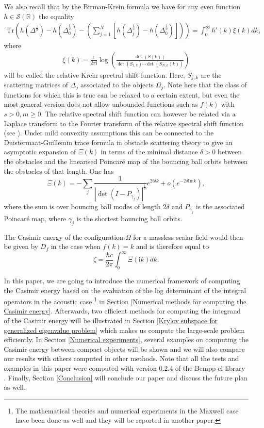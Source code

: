 We also recall that by the Birman-Krein formula we have for any even function $h \in \mathcal{S}(\mathbb{R})$ the equality
\begin{align}\label{B-K formula}
    \text{Tr}\left(h(\Delta^{\frac{1}{2}}) - h(\Delta_{0}^{\frac{1}{2}}) - \left(\sum_{j = 1}^{N}[h(\Delta_{j}^{\frac{1}{2}}) - h(\Delta_{0}^{\frac{1}{2}})]\right)\right)  = \int_{0}^{\infty}h'(k)\xi(k)dk,
\end{align}
where 
\begin{align*}
    \xi(k) = \frac{1}{2\pi \mathrm{i}}\log\left(\frac{\det(S(k))}{\det(S_{1,k})\cdots\det(S_{N,k}(k))}\right)
\end{align*}
will be called the relative Krein spectral shift function. Here, $S_{j,k}$ are the scattering matrices of $\Delta_{j}$ associated to the objects $\Omega_{j}$. Note here that the class of functions for which this is true can be relaxed to a certain extent, but even the most general version does not allow unbounded functions such as $f(k)$ with $s>0, m\geq 0$.
The relative spectral shift function can however be related via a Laplace transform to the Fourier transform of the relative spectral shift function (see \cite{MR4396069}). Under mild convexity assumptions this can be connected to the Duistermaat-Guillemin trace formula in obstacle scattering theory to give an asymptotic expansion of  $\Xi(k)$ 
in terms of the minimal distance $\delta>0$ between the obstacles and the linearised Poincar\'e map of the bouncing ball orbits between the obstacles of that length. One has
$$
 \Xi(k) =- \sum_{j} \frac{1}{|\det(I - P_{\gamma_j})|^{\frac{1}{2}}} e^{2 i \delta k} + o(e^{- 2 \delta \text{Im}{k}}),
$$
where the sum is over  bouncing ball modes of length $2 \delta$ and $P_{\gamma_j}$ is the associated Poincar\'e map, where $\gamma_{j}$ is the shortest bouncing ball orbits. 

The Casimir energy of the configuration $\Omega$ for a massless scalar field would then be given by $D_f$ in the case when $f(k)=k$ and is therefore equal to
$$
\zeta = \frac{\hbar c}{2 \pi} \int _{0}^{\infty} \Xi(\mathrm{i}k) dk.
$$

In this paper, we are going to introduce the numerical framework of computing the Casimir energy based on the evaluation of the log determinant of the integral 
operators in the acoustic case \footnote{The mathematical theories and numerical experiments in the Maxwell case have been done as well and they will be 
reported in another paper.} in Section \ref{Numerical methods for computing the Casimir energy}. Afterwards,
two efficient methods for computing the integrand of the Casimir energy will be illustrated in Section \ref{Krylov subspace for generalized eigenvalue problem}
which makes us compute the large-scale problem efficiently. In Section \ref{Numerical experiments}, several examples on computing the Casimir energy between 
 compact objects will be shown and we will also compare our results with others computed in other methods. Note that all the tests and examples in this paper were computed 
with version 0.2.4 of the Bempp-cl library \cite{scroggs2017software}. Finally, Section \ref{Conclusion} will conclude 
our paper and discuss the future plan as well.


